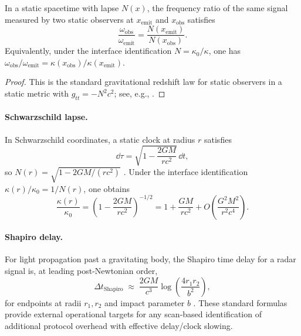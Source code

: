 \begin{proposition}\label{prop:static_redshift_lapse}
In a static spacetime with lapse $N(x)$, the frequency ratio of the same signal measured by two static observers at $x_{\mathrm{emit}}$ and $x_{\mathrm{obs}}$ satisfies
\[
\frac{\omega_{\mathrm{obs}}}{\omega_{\mathrm{emit}}}=\frac{N(x_{\mathrm{emit}})}{N(x_{\mathrm{obs}})}.
\]
Equivalently, under the interface identification $N=\kappa_0/\kappa$, one has $\omega_{\mathrm{obs}}/\omega_{\mathrm{emit}}=\kappa(x_{\mathrm{obs}})/\kappa(x_{\mathrm{emit}})$.
\end{proposition}
\begin{proof}
This is the standard gravitational redshift law for static observers in a static metric with $g_{tt}=-N^2c^2$; see, e.g., \cite{Wald1984,Will1993}.
\end{proof}

\paragraph{Schwarzschild lapse.}
In Schwarzschild coordinates, a static clock at radius $r$ satisfies
\begin{equation}
\label{eq:schwarzschild_lapse}
\dd\tau=\sqrt{1-\frac{2GM}{rc^2}}\,\dd t,
\end{equation}
so $N(r)=\sqrt{1-2GM/(rc^2)}$ \cite{Wald1984}.
Under the interface identification $\kappa(r)/\kappa_0=1/N(r)$, one obtains
\begin{equation}
\label{eq:kappa_schwarzschild_series}
\frac{\kappa(r)}{\kappa_0}=\left(1-\frac{2GM}{rc^2}\right)^{-1/2}
=1+\frac{GM}{rc^2}+O\!\left(\frac{G^2M^2}{r^2c^4}\right).
\end{equation}

\paragraph{Shapiro delay.}
For light propagation past a gravitating body, the Shapiro time delay for a radar signal is, at leading post-Newtonian order,
\begin{equation}
\label{eq:shapiro_delay}
\Delta t_{\mathrm{Shapiro}}\;\approx\;\frac{2GM}{c^3}\log\!\left(\frac{4r_1 r_2}{b^2}\right),
\end{equation}
for endpoints at radii $r_1,r_2$ and impact parameter $b$ \cite{Shapiro1964,Will1993}.
These standard formulas provide external operational targets for any scan-based identification of additional protocol overhead with effective delay/clock slowing.

